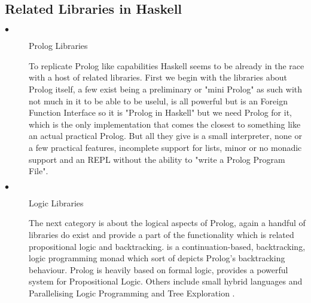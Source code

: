 \documentclass[proposal.tex]{subfiles}
\begin{document}
	
\subsection{Related Libraries in Haskell}
\begin{description}
\item[$\bullet$]Prolog Libraries

To replicate Prolog like capabilities Haskell seems to be already in the race with a host of related libraries. First we begin with the libraries about Prolog itself, a few exist \cite{nanoprolog-lib} being a preliminary or "mini Prolog" as such with not much in it to be able to be uselul, \cite{hswip-lib} is all powerful but is an Foreign Function Interface so it is "Prolog in Haskell" but we need Prolog for it, \cite{prolog-lib} which is the only implementation that comes the closest to something like an actual practical Prolog. But all they give is a small interpreter, none or a few practical features, incomplete support for lists, minor or no monadic support and an REPL without the ability to "write a Prolog Program File".  

\begin{comment}
\begin{enumerate}
	\item Nano Prolog
	\item Prolog
	\item cspm-To-Prolog
	\item prolog-graph and prolog-graph-lib
	\item hswip,
	\\* \url{https://groups.google.com/forum/#!topic/haskell-cafe/3vmCuw7NlWE}	
\end{enumerate}
\end{comment}

\item[$\bullet$]Logic Libraries

The next category is about the logical aspects of Prolog, again a handful of libraries do exist and provide a part 
of the functionality which is related propositional logic and backtracking. \cite{logict-lib} is a 
continuation-based, backtracking, logic programming monad which sort of depicts Prolog's backtracking 
behaviour. Prolog is heavily based on formal logic, \cite{proplogic-lib} provides a powerful system for 
Propositional Logic. Others include small hybrid languages \cite{cflp-lib} and Parallelising Logic Programming 
and Tree Exploration \cite{logic-grows-on-trees-lib}.          


\end{description}
\end{document}
